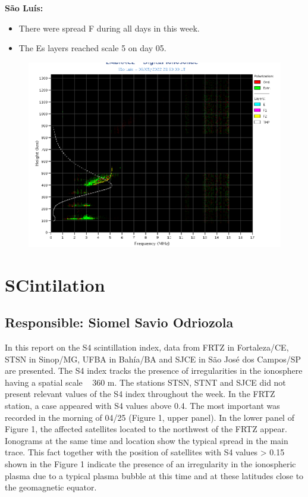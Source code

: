 \documentclass[a4paper, 10pt]{article}
\begin{document}
\textbf{São Luís: }

 \begin{itemize}
\item There were spread F during all days in this week.
\item The Es layers reached scale 5 on day 05. 
\end{itemize}
\begin{figure}[H]
    \centering
    \includegraphics[width=14cm]{./figures//SãoLuís.png}
\end{figure}

\section{SCintilation} 
 \subsection{Responsible: Siomel Savio Odriozola} 
 
In this report on the S4 scintillation index, data from FRTZ in Fortaleza/CE, STSN 
in Sinop/MG, UFBA in Bahía/BA and SJCE in São José dos Campos/SP are 
presented. The S4 index tracks the presence of irregularities in the ionosphere 
having a spatial scale ~ 360 m. 
The stations STSN, STNT and SJCE did not present relevant values of the S4 
index throughout the week. In the FRTZ station, a case appeared with S4 values 
above 0.4. The most important was recorded in the morning of 04/25 (Figure 1, 
upper panel). In the lower panel of Figure 1, the affected satellites located to the 
northwest of the FRTZ appear. Ionograms at the same time and location show 
the typical spread in the main trace. This fact together with the position of 
satellites with S4 values > 0.15 shown in the Figure 1 indicate the presence of an 
irregularity in the ionospheric plasma due to a typical plasma bubble at this time 
and at these latitudes close to the geomagnetic equator. 
\end{document}

